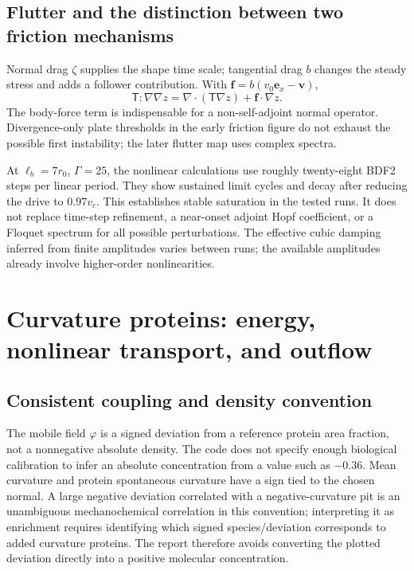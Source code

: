 \subsection{Flutter and the distinction between two friction mechanisms}
Normal drag $\zeta$ supplies the shape time scale; tangential drag $b$ changes the steady stress and adds a follower contribution. With $\bm f=b(v_0\bm e_x-\bm v)$,
\begin{equation}
\mathsf T:\nabla\nabla z=\nabla\cdot(\mathsf T\nabla z)+\bm f\cdot\nabla z.
\end{equation}
The body-force term is indispensable for a non-self-adjoint normal operator. Divergence-only plate thresholds in the early friction figure do not exhaust the possible first instability; the later flutter map uses complex spectra.

At $\ell_b=7r_0$, $\Gamma=25$, the nonlinear calculations use roughly twenty-eight BDF2 steps per linear period. They show sustained limit cycles and decay after reducing the drive to $0.97v_c$. This establishes stable saturation in the tested runs. It does not replace time-step refinement, a near-onset adjoint Hopf coefficient, or a Floquet spectrum for all possible perturbations. The effective cubic damping inferred from finite amplitudes varies between runs; the available amplitudes already involve higher-order nonlinearities.

\section{Curvature proteins: energy, nonlinear transport, and outflow}
\subsection{Consistent coupling and density convention}
The mobile field $\varphi$ is a signed deviation from a reference protein area fraction, not a nonnegative absolute density. The code does not specify enough biological calibration to infer an absolute concentration from a value such as $-0.36$. Mean curvature and protein spontaneous curvature have a sign tied to the chosen normal. A large negative deviation correlated with a negative-curvature pit is an unambiguous mechanochemical correlation in this convention; interpreting it as enrichment requires identifying which signed species/deviation corresponds to added curvature proteins. The report therefore avoids converting the plotted deviation directly into a positive molecular concentration.

